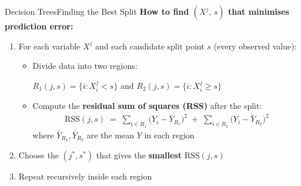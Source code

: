 \documentclass[hyperref={pdfpagelabels=false}]{beamer}
\begin{document}
\begin{frame}{Decision Trees}{Finding the Best Split}
\textbf{How to find $(X^j,\, s)$ that minimises prediction error:}
\vspace{0.2cm}
\begin{enumerate}
  \item For each variable $X^j$ and each candidate split point $s$ (every observed value):
  \vspace{0.2cm}

  \begin{itemize}
    \item Divide data into two regions:
 

      $R_1(j,s) = \{i : X^j_i < s\}$ and $R_2(j,s) = \{i : X^j_i \geq s\}$
         \vspace{0.2cm}
    \item Compute the \textbf{residual sum of squares (RSS)} after the split:
    \begin{align*}
      \text{RSS}(j,s) \;=\;
      \sum_{i\in R_1}\!\bigl(Y_i - \bar{Y}_{R_1}\bigr)^2
      \;+\;
      \sum_{i\in R_2}\!\bigl(Y_i - \bar{Y}_{R_2}\bigr)^2
    \end{align*}
    where $\bar{Y}_{R_1},\bar{Y}_{R_2}$ are the mean $Y$ in each region\
    \vspace{0.2cm}

  \end{itemize}
  \item Choose the $(j^*, s^*)$ that gives the \textbf{smallest} $\text{RSS}(j,s)$
  \vspace{0.2cm}
  \item Repeat recursively inside each region
\end{enumerate}



\end{frame}
\end{document}
